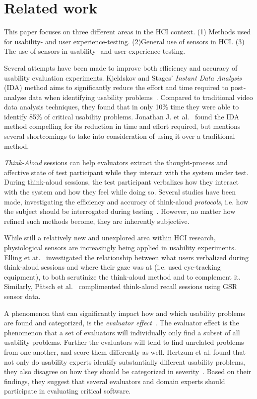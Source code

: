 \section{Related work}
This paper focuses on three different areas in the HCI context. (1) Methods used for usability- and user experience-testing. (2)General use of sensors in HCI. (3) The use of sensors in usability- and user experience-testing.

Several attempts have been made to improve both efficiency and accuracy of
usability evaluation experiments. Kjeldskov and Stages' \textit{Instant Data
Analysis} (IDA) method aims to significantly reduce the effort and time required
to post-analyse data when identifying usability
problems~\cite{instant_data_analysis}. Compared to traditional video data
analysis techniques, they found that in only 10\% time they were able to
identify 85\% of critical usability problems. Jonathan J. et
al.~\cite{use_of_TA_and_IDA} found the IDA
method compelling for its reduction in time and effort required, but mentions
several shortcomings to take into consideration of using it over a traditional
method.

\textit{Think-Aloud} sessions can help evaluators extract the thought-process
and affective state of test participant while they interact with the system
under test. During think-aloud sessions, the test participant verbalizes how
they interact with the system and how they feel while doing so.  Several studies
have been made, investigating the efficiency and accuracy of think-aloud
\textit{protocols}, i.e. how the subject should be interrogated during
testing~\cite{two_think_aloud_protocols_study}. However, no matter how refined
such methods become, they are inherently subjective.

While still a relatively new and unexplored area within HCI research,
physiological sensors are increasingly being applied in usability experiments.
Elling et at.~\cite{concurrent_think_aloud_eye_tracking} investigated the
relationship between what users verbalized during think-aloud sessions and where
their gaze was at (i.e. used eye-tracking equipment), to both scrutinize the
think-aloud method and to complement it. Similarly, P\"{a}tsch et
al.~\cite{using_sensor_graphs_think_aloud} complimented think-aloud recall
sessions using GSR sensor data.

A phenomenon that can significantly impact how and which usability problems are
found and categorized, is the \textit{evaluator effect}~\cite{eval_effect}.
The evaluator effect is the phenomenon that a set of evaluators will individually only find a subset of all usability problems.
Further the evaluators will tend to find unrelated problems from one another, and score them differently as well.\cite{eval_effect}
Hertzum et al. found that not only do
usability experts identify substantially different usability problems, they also
disagree on how they should be categorized in
severity~\cite{eval_effect_research}. Based on their findings, they suggest that
several evaluators and domain experts should participate in evaluating critical
software.

